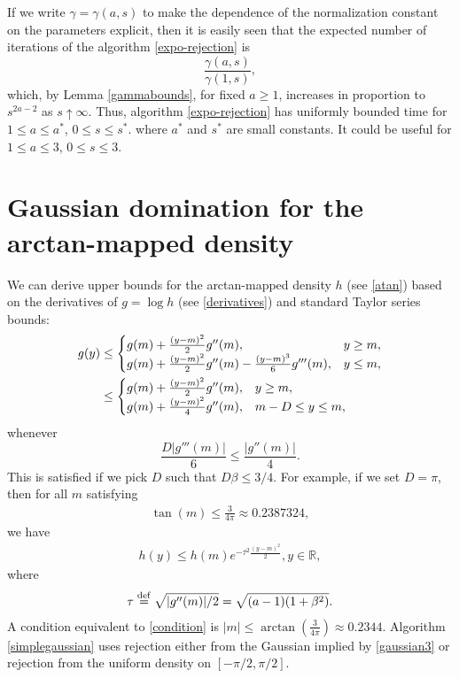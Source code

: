 \documentclass[12pt,reqno,tbtags]{amsart}
\newcommand{\RR}{\mathbb{R}}
\newcommand{\isdef}{\buildrel {\rm def} \over =}
\begin{document}
If we write $\gamma = \gamma (a,s)$ to make the dependence of the normalization constant on the
parameters explicit, then it is easily seen that the expected number of iterations of the 
algorithm \ref{expo-rejection} is
$$
\frac{\gamma (a,s)}{\gamma (1,s)},
$$
which, by Lemma \ref{gammabounds}, for fixed $a \ge 1$, increases in proportion to $s^{2a-2}$ as $s \uparrow \infty$. Thus, algorithm \ref{expo-rejection} has uniformly bounded time for $1 \le a \le a^*$,
$0 \le s \le s^*$. where $a^*$ and $s^*$ are small constants.  It could be useful for $1 \le a \le 3$, $0 \le s \le 3$.



\section{Gaussian domination for the arctan-mapped density}\label{gaussian}

We can derive upper bounds for the arctan-mapped density $h$ (see \eqref{atan}) based on
the derivatives of $g=\log h$ (see \eqref{derivatives}) and standard Taylor series bounds:
\begin{align}
g(y) 
&\le 
\begin{cases}
g(m) + \frac{(y-m)^2}{2} g''(m), & y \ge m , \cr
g(m) + \frac{(y-m)^2}{2} g''(m) - \frac{(y-m)^3}{6} g'''(m), & y \le m, \cr
\end{cases}  \\
&\le 
\begin{cases}
g(m) + \frac{(y-m)^2}{2} g''(m), & y \ge m , \cr
g(m) + \frac{(y-m)^2}{4} g''(m),  & m - D \le y \le m, \cr
\end{cases}\label{gaussian2}
\end{align}
whenever 
$$
\frac {D |g'''(m)|}{6} \le \frac{ |g''(m)|}{4}.
$$
This is satisfied if we pick $D$ such that $D \beta \le 3/4$.
For example, if we set $D=\pi$, then for all $m$ satisfying
\begin{align}\label{condition}
\tan (m) \le \frac{3}{4 \pi} \approx 0.2387324,
\end{align}
we have
\begin{align}\label{gaussian3}
h(y) \le 
h(m) e^{-\tau^2 \frac{(y-m)^2}{2}}, y \in \RR,
\end{align}
where
\begin{align*}
\tau \isdef \sqrt {|g''(m)|/2} = \sqrt{(a-1)(1+\beta^2)}.
\end{align*}
A condition equivalent to \eqref{condition}
is $|m| \le \arctan \left( \frac{3}{4\pi} \right) \approx 0.2344$. 
Algorithm  \ref{simplegaussian} uses rejection either from the Gaussian implied by \eqref{gaussian3} or rejection from the uniform density on $[-\pi/2,\pi/2]$.
\end{document}
